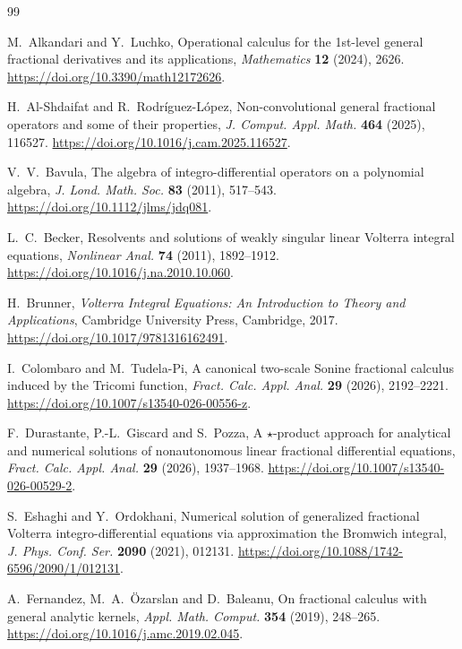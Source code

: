 \documentclass[11pt]{article}
\numberwithin{equation}{section}
\theoremstyle{definition}
\theoremstyle{remark}
\begin{document}
\begin{thebibliography}{99}

M.~Alkandari and Y.~Luchko,
Operational calculus for the 1st-level general fractional derivatives and its applications,
\emph{Mathematics} \textbf{12} (2024), 2626.
\url{https://doi.org/10.3390/math12172626}.

H.~Al-Shdaifat and R.~Rodr\'iguez-L\'opez,
Non-convolutional general fractional operators and some of their properties,
\emph{J. Comput. Appl. Math.} \textbf{464} (2025), 116527.
\url{https://doi.org/10.1016/j.cam.2025.116527}.

V.~V.~Bavula,
The algebra of integro-differential operators on a polynomial algebra,
\emph{J. Lond. Math. Soc.} \textbf{83} (2011), 517--543.
\url{https://doi.org/10.1112/jlms/jdq081}.

L.~C.~Becker,
Resolvents and solutions of weakly singular linear Volterra integral equations,
\emph{Nonlinear Anal.} \textbf{74} (2011), 1892--1912.
\url{https://doi.org/10.1016/j.na.2010.10.060}.

H.~Brunner,
\emph{Volterra Integral Equations: An Introduction to Theory and Applications},
Cambridge University Press, Cambridge, 2017.
\url{https://doi.org/10.1017/9781316162491}.

I.~Colombaro and M.~Tudela-Pi,
A canonical two-scale Sonine fractional calculus induced by the Tricomi function,
\emph{Fract. Calc. Appl. Anal.} \textbf{29} (2026), 2192--2221.
\url{https://doi.org/10.1007/s13540-026-00556-z}.

F.~Durastante, P.-L.~Giscard and S.~Pozza,
A $\star$-product approach for analytical and numerical solutions of nonautonomous linear fractional differential equations,
\emph{Fract. Calc. Appl. Anal.} \textbf{29} (2026), 1937--1968.
\url{https://doi.org/10.1007/s13540-026-00529-2}.

S.~Eshaghi and Y.~Ordokhani,
Numerical solution of generalized fractional Volterra integro-differential equations via approximation the Bromwich integral,
\emph{J. Phys. Conf. Ser.} \textbf{2090} (2021), 012131.
\url{https://doi.org/10.1088/1742-6596/2090/1/012131}.

A.~Fernandez, M.~A.~\"Ozarslan and D.~Baleanu,
On fractional calculus with general analytic kernels,
\emph{Appl. Math. Comput.} \textbf{354} (2019), 248--265.
\url{https://doi.org/10.1016/j.amc.2019.02.045}.


\end{thebibliography}
\end{document}
